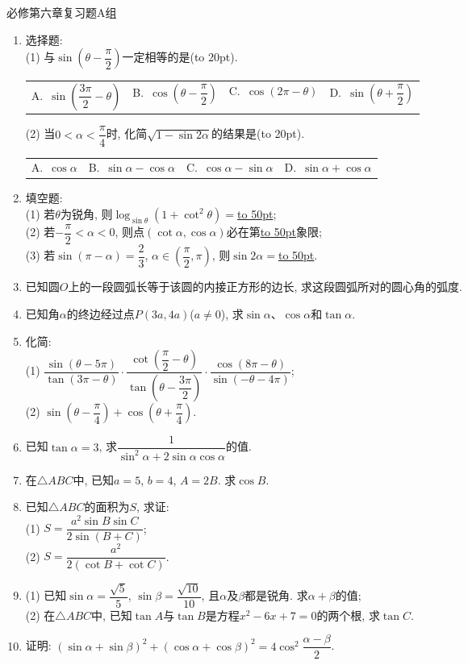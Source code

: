 \documentclass[10pt,a4paper]{article}
\newcommand{\blank}[1]{\underline{\hbox to #1pt{}}}
\newcommand{\bracket}[1]{(\hbox to #1pt{})}
\newcommand{\fourch}[4]{\par\begin{tabular}{p{.23\textwidth}p{.23\textwidth}p{.23\textwidth}p{.23\textwidth}}
A.~#1 &B.~#2& C.~#3& D.~#4
\end{tabular}}
\begin{document}
必修第六章复习题A组
\begin{enumerate}[1.]

\item 选择题:\\
(1) 与$\sin(\theta -\dfrac\pi 2)$一定相等的是\bracket{20}.
\fourch{$\sin(\dfrac{3\pi}2-\theta)$}{$\cos(\theta -\dfrac{\pi}2)$}{$\cos (2\pi -\theta)$}{$\sin (\theta +\dfrac\pi 2)$}
(2) 当$0<\alpha<\dfrac\pi 4$时, 化简$\sqrt{1-\sin 2\alpha}$的结果是\bracket{20}.
\fourch{$\cos \alpha$}{$\sin \alpha-\cos \alpha$}{$\cos\alpha-\sin\alpha$}{$\sin\alpha+\cos\alpha$}
\vspace*{3cm}
\item 填空题:\\
(1) 若$\theta$为锐角, 则$\log_{\sin \theta} (1+\cot^2\theta)=$\blank{50};\\
(2) 若$-\dfrac\pi 2<\alpha<0$, 则点$(\cot \alpha, \cos \alpha)$必在第\blank{50}象限;\\
(3) 若$\sin (\pi -\alpha)=\dfrac 23$, $\alpha\in (\dfrac\pi 2, \pi)$, 则$\sin 2\alpha=$\blank{50}.
\vspace*{3cm}
\item 已知圆$O$上的一段圆弧长等于该圆的内接正方形的边长, 求这段圆弧所对的圆心角的弧度.
\vspace*{3cm}
\item 已知角$\alpha$的终边经过点$P(3a, 4a)$($a\ne 0$), 求$\sin \alpha$、$\cos \alpha$和$\tan \alpha$.
\vspace*{3cm}
\item 化简:\\
(1) $\dfrac{\sin (\theta -5\pi )}{\tan (3\pi -\theta )}\cdot \dfrac{\cot (\dfrac\pi 2-\theta )}{\tan (\theta -\dfrac{3\pi} 2)}\cdot \dfrac{\cos (8\pi -\theta )}{\sin(-\theta-4\pi)}$;\\
(2) $\sin (\theta -\dfrac\pi 4)+\cos (\theta +\dfrac\pi 4)$.
\vspace*{3cm}
\item 已知$\tan \alpha=3$, 求$\dfrac 1{\sin^2\alpha+2\sin \alpha\cos \alpha}$的值.
\vspace*{3cm}
\item 在$\triangle ABC$中, 已知$a=5$, $b=4$, $A=2B$. 求$\cos B$.
\vspace*{3cm}
\item 已知$\triangle ABC$的面积为$S$, 求证:\\
(1) $S=\dfrac{a^2\sin B\sin C}{2\sin (B+C)}$;\\
(2) $S=\dfrac{a^2}{2(\cot B+\cot C)}$.
\vspace*{3cm}
\item (1) 已知$\sin \alpha=\dfrac{\sqrt 5}5$, $\sin \beta=\dfrac{\sqrt {10}}{10}$, 且$\alpha$及$\beta$都是锐角. 求$\alpha+\beta$的值;\\
(2) 在$\triangle ABC$中, 已知$\tan A$与$\tan B$是方程$x^2-6x+7=0$的两个根, 求$\tan C$.
\vspace*{3cm}
\item 证明: $(\sin \alpha+\sin \beta)^2+(\cos \alpha+\cos \beta)^2=4\cos^2\dfrac{\alpha-\beta}{2}$. 
\vspace*{3cm}
\end{enumerate}
\end{document}
